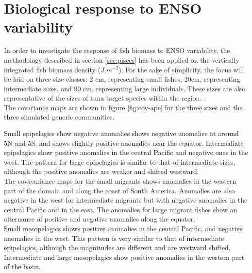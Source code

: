 \section{Biological response to ENSO variability}

In order to investigate the response of fish biomass to ENSO variability, the methodology described in section \ref{sec:pisces} has been applied on the vertically integrated fish biomass density ($J.m^{-2}$).
For the sake of simplicity, the focus will be laid on three size classes: 2 cm, representing small fishes, 20cm, representing intermediate sizes, and 90 cm, representing large individuals. These sizes are also
representative of the sizes of tuna target species within the region.
.  \\ 

The covariance maps are shown in figure \ref{fig:cov-ape} for the three sizes and the three simulated generic communities. 

Small epipelagics show negative anomalies shows negative anomalies at around 5N and 5S, and shows slightly positive anomalies 
near the equator. Intermediate epipelagics show positive anomalies in the central Pacific and negative ones in the west.
The pattern for large epipelagics is similar to that of intermediate sizes, although the positive anomalies are weaker and shifted westward.\\

The covavariance maps for the small migrants shows anomalies in the western part of the domain and along the coast of South America. Anomalies are also negative in the west for intermediate migrants but with negative anomalies in the central Pacific and in the east. The anomalies for large migrant fishes show an alternance of positive and negative anomalies along the equator. \\

Small mesopelagics shows positive anomalies in the central Pacific, and negative anomalies in the west.  
This pattern is very similar to that of intermediate epipelagics, although the magnitudes are different and are westward shifted. Intermediate and large mesopelagics show positive anomalies in the western part of the basin. \\ 

